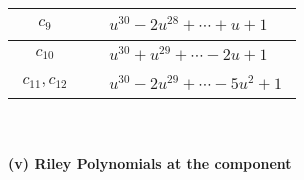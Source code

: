 \documentclass[1p]{elsarticle_modified}
\theoremstyle{definition}
\begin{document}
\begin{tabular}{m{50pt}|m{274pt}}
\hline $$\begin{aligned}c_{9}\end{aligned}$$&$\begin{aligned}
&u^{30}-2 u^{28}+\cdots+u+1
\end{aligned}$\\
\hline $$\begin{aligned}c_{10}\end{aligned}$$&$\begin{aligned}
&u^{30}+u^{29}+\cdots-2 u+1
\end{aligned}$\\
\hline $$\begin{aligned}c_{11},c_{12}\end{aligned}$$&$\begin{aligned}
&u^{30}-2 u^{29}+\cdots-5 u^2+1
\end{aligned}$\\
\hline
\end{tabular}\\~\\
\newpage\renewcommand{\arraystretch}{1}
\flushleft \textbf{(v) Riley Polynomials at the component}\newline \\
\end{document}
